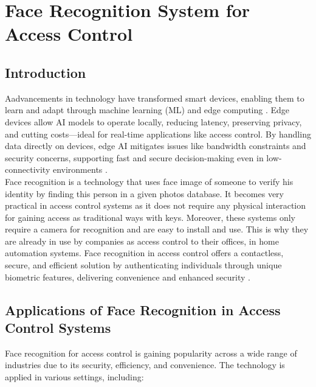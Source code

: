 %
%

\chapter{Face Recognition System for Access Control}
\section{Introduction}

Aadvancements in technology have transformed smart devices, enabling them to learn and adapt through machine learning (ML) \cite{liu:2018} and edge computing \cite{jiang:2020}. Edge devices allow AI models to operate locally, reducing latency, preserving privacy, and cutting costs—ideal for real-time applications like access control. By handling data directly on devices, edge AI mitigates issues like bandwidth constraints and security concerns, supporting fast and secure decision-making even in low-connectivity environments \cite{datascience_edge_ai:2024} \cite{Research_Gate:2019} \cite{chen:2023}. 
\\

Face recognition is a technology that uses face image of someone to verify his identity by finding this person in a given photos database. It becomes very practical in access control systems as it does not require any physical interaction for gaining access as traditional ways with keys. Moreover, these systems only require a camera for recognition and are easy to install and use. This is why they are already in use by companies as access control to their offices, in home automation systems. \cite{yang:2020}
Face recognition in access control offers a contactless, secure, and efficient solution by authenticating individuals through unique biometric features, delivering convenience and enhanced security \cite{ieee:2021} .

\section{Applications of Face Recognition in Access Control Systems}
Face recognition for access control is gaining popularity across a wide range of industries due to its security, efficiency, and convenience. The technology is applied in various settings, including:

